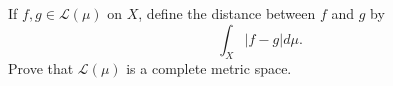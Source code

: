 \begin{exercise}
	If $f, g \in \mathscr{L} \left( \mu \right)$ on $X$, define the distance between $f$ and $g$ by
	\begin{equation*}
	\int_X \left| f - g \right| d\mu.
	\end{equation*}
	Prove that $\mathscr{L} \left( \mu \right)$ is a complete metric space.
\end{exercise}
